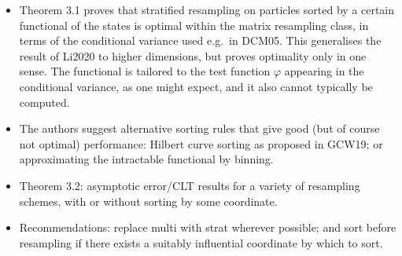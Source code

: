 \documentclass{article}
\begin{document}
\begin{itemize}
\item Theorem 3.1 proves that stratified resampling on particles sorted by a certain functional of the states is optimal within the matrix resampling class, in terms of the conditional variance used e.g.\ in DCM05. This generalises the result of Li2020 to higher dimensions, but proves optimality only in one sense. The functional is tailored to the test function $\varphi$ appearing in the conditional variance, as one might expect, and it also cannot typically be computed. 
\item The authors suggest alternative sorting rules that give good (but of course not optimal) performance: Hilbert curve sorting as proposed in GCW19; or approximating the intractable functional by binning.
\item Theorem 3.2: asymptotic error/CLT results for a variety of resampling schemes, with or without sorting by some coordinate.
\item Recommendations: replace multi with strat wherever possible; and sort before resampling if there exists a suitably influential coordinate by which to sort.
\end{itemize}
\end{document}
